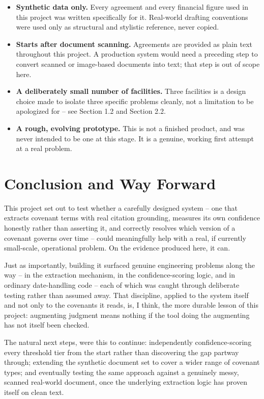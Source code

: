 \documentclass[11pt,a4paper]{article}
\begin{document}
\begin{itemize}[leftmargin=1.4em]
\item \textbf{Synthetic data only.} Every agreement and every financial figure used in this project was written specifically for it. Real-world drafting conventions were used only as structural and stylistic reference, never copied.
\item \textbf{Starts after document scanning.} Agreements are provided as plain text throughout this project. A production system would need a preceding step to convert scanned or image-based documents into text; that step is out of scope here.
\item \textbf{A deliberately small number of facilities.} Three facilities is a design choice made to isolate three specific problems cleanly, not a limitation to be apologized for -- see Section 1.2 and Section 2.2.
\item \textbf{A rough, evolving prototype.} This is not a finished product, and was never intended to be one at this stage. It is a genuine, working first attempt at a real problem.
\end{itemize}

\section{Conclusion and Way Forward}

This project set out to test whether a carefully designed system -- one that extracts covenant terms with real citation grounding, measures its own confidence honestly rather than asserting it, and correctly resolves which version of a covenant governs over time -- could meaningfully help with a real, if currently small-scale, operational problem. On the evidence produced here, it can.

Just as importantly, building it surfaced genuine engineering problems along the way -- in the extraction mechanism, in the confidence-scoring logic, and in ordinary date-handling code -- each of which was caught through deliberate testing rather than assumed away. That discipline, applied to the system itself and not only to the covenants it reads, is, I think, the more durable lesson of this project: augmenting judgment means nothing if the tool doing the augmenting has not itself been checked.

The natural next steps, were this to continue: independently confidence-scoring every threshold tier from the start rather than discovering the gap partway through; extending the synthetic document set to cover a wider range of covenant types; and eventually testing the same approach against a genuinely messy, scanned real-world document, once the underlying extraction logic has proven itself on clean text.
\end{document}

